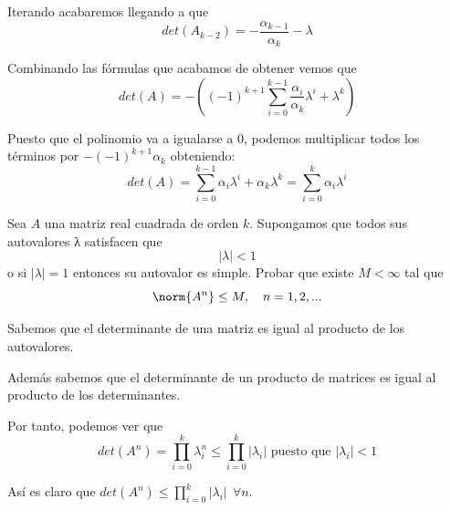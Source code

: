 \begin{problem}[1]
Iterando acabaremos llegando a que
\[det(A_{k-2}) = -\frac{α_{k-1}}{α_k}-λ\]

Combinando las fórmulas que acabamos de obtener vemos que
\[det(A) = -\left((-1)^{k+1}\sum_{i=0}^{k-1}\frac{α_i}{α_k}λ^{i} + λ^k\right)\]

Puesto que el polinomio va a igualarse a 0, podemos multiplicar todos los términos por $-(-1)^{k+1}α_k$ obteniendo:
\[det(A) = \sum_{i=0}^{k-1}α_iλ^i + α_kλ^k = \sum_{i=0}^k α_iλ^i\]

\end{problem}

\begin{problem}[2]
Sea $A$ una matriz real cuadrada de orden $k$. Supongamos que todos sus autovalores λ satisfacen que
\[|λ| < 1\]
o si $|λ|=1$ entonces su autovalor es simple. Probar que existe $M<\infty$ tal que
\[\norm{A^n} \leq M, \ \ \ n=1,2,...\]
\solution


Sabemos que el determinante de una matriz es igual al producto de los autovalores.

Además sabemos que el determinante de un producto de matrices es igual al producto de los determinantes.

Por tanto, podemos ver que
\[det(A^n)=\prod_{i=0}^kλ_i^n \leq \prod_{i=0}^k|λ_i| \text{ puesto que } |λ_i| < 1\]

Así es claro que $det(A^n) \leq \prod_{i=0}^k |λ_i| \ \ \forall n$.
\end{problem}

